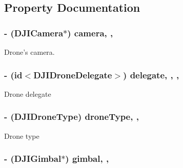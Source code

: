 \subsection{Property Documentation}
\hypertarget{interface_d_j_i_drone_adf9479847eb1e9826dcadfeeab3b12d0}{
\subsubsection[{camera}]{\setlength{\rightskip}{0pt plus 5cm}-\/ ({\bf D\+J\+I\+Camera}$\ast$) camera\hspace{0.3cm}{\ttfamily [read]}, {\ttfamily [nonatomic]}, {\ttfamily [assign]}}}\label{interface_d_j_i_drone_adf9479847eb1e9826dcadfeeab3b12d0}
Drone's camera. \hypertarget{interface_d_j_i_drone_a348f8faf9da7670e19289130c4490c9a}{
\subsubsection[{delegate}]{\setlength{\rightskip}{0pt plus 5cm}-\/ (id$<$D\+J\+I\+Drone\+Delegate$>$) delegate\hspace{0.3cm}{\ttfamily [read]}, {\ttfamily [write]}, {\ttfamily [nonatomic]}, {\ttfamily [weak]}}}\label{interface_d_j_i_drone_a348f8faf9da7670e19289130c4490c9a}
Drone delegate \hypertarget{interface_d_j_i_drone_a5f830dba99822f494acfd499308d3818}{
\subsubsection[{drone\+Type}]{\setlength{\rightskip}{0pt plus 5cm}-\/ (D\+J\+I\+Drone\+Type) drone\+Type\hspace{0.3cm}{\ttfamily [read]}, {\ttfamily [nonatomic]}, {\ttfamily [assign]}}}\label{interface_d_j_i_drone_a5f830dba99822f494acfd499308d3818}
Drone type \hypertarget{interface_d_j_i_drone_a4e03ec9b32a2ab6a9755ff9c065cca76}{
\subsubsection[{gimbal}]{\setlength{\rightskip}{0pt plus 5cm}-\/ ({\bf D\+J\+I\+Gimbal}$\ast$) gimbal\hspace{0.3cm}{\ttfamily [read]}, {\ttfamily [nonatomic]}, {\ttfamily [assign]}}}\label{interface_d_j_i_drone_a4e03ec9b32a2ab6a9755ff9c065cca76}
